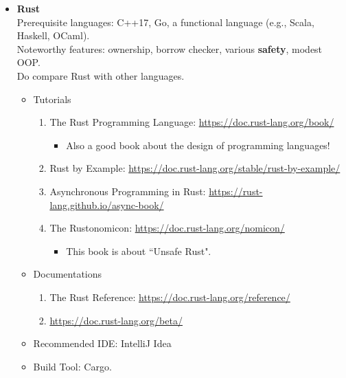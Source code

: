 \documentclass{article}
\begin{document}
\begin{itemize}
    \item \textbf{Rust}\\
    Prerequisite languages: C++17, Go, a functional language (e.g., Scala, Haskell, OCaml).\\
    Noteworthy features: ownership, borrow checker, various \textbf{safety}, modest OOP.\\
    Do compare Rust with other languages.
    \begin{itemize}
        \item Tutorials
        \begin{enumerate}
            \item The Rust Programming Language:
            \href{https://doc.rust-lang.org/book/}{https://doc.rust-lang.org/book/}
            \begin{itemize}
                \item Also a good book about the design of programming languages!
            \end{itemize}
            \item Rust by Example:
            \href{https://doc.rust-lang.org/stable/rust-by-example/}{https://doc.rust-lang.org/stable/rust-by-example/}
            \item Asynchronous Programming in Rust:
            \href{https://rust-lang.github.io/async-book/}{https://rust-lang.github.io/async-book/}
            \item The Rustonomicon:
            \href{https://doc.rust-lang.org/nomicon/}{https://doc.rust-lang.org/nomicon/}
            \begin{itemize}
                \item This book is about ``Unsafe Rust".
            \end{itemize}
        \end{enumerate}
        \item Documentations
        \begin{enumerate}
            \item The Rust Reference:
            \href{https://doc.rust-lang.org/reference/}{https://doc.rust-lang.org/reference/}
            \item \href{https://doc.rust-lang.org/beta/}{https://doc.rust-lang.org/beta/}
        \end{enumerate}
        \item Recommended IDE: IntelliJ Idea
        \item Build Tool: Cargo.
        \begin{itemize}

\end{itemize}
\end{itemize}
\end{itemize}
\end{document}
